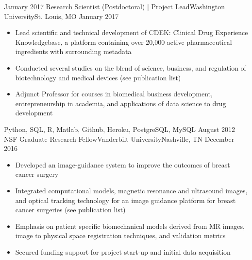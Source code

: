 %
%
%
\begin{experiences}
  \experience
    {January 2017}   {Research Scientist (Postdoctoral) | Project Lead}{Washington University}{St. Louis, MO}
    {January 2017} {
                      \begin{itemize}
                        \item Lead scientific and technical development of CDEK: Clinical Drug Experience Knowledgebase, a platform containing over 20,000 active pharmaceutical ingredients with surrounding metadata                
                        \item Conducted several studies on the blend of science, business, and regulation of biotechnology and medical devices (\aiOrcid see publication list)
                        \item Adjunct Professor for courses in biomedical business development, entrepreneurship in academia, and applications of data science to drug development                                                                
                      \end{itemize}
                    }
                    {Python, SQL, R, Matlab, Github, Heroku, PostgreSQL, MySQL}
  \emptySeparator
  \experience
    {August 2012} {NSF Graduate Research Fellow}{Vanderbilt University}{Nashville, TN}
    {December 2016}    {
                      \begin{itemize}
                        \item Developed an image-guidance system to improve the outcomes of breast cancer surgery                          
                        \item Integrated computational models, magnetic resonance and ultrasound images, and optical tracking technology for an image guidance platform for breast cancer surgeries (\aiOrcid see publication list)           
                        \item Emphasis on patient specific biomechanical models derived from MR images, image to physical space registration techniques, and validation metrics 
                        \item Secured funding support for project start-up and initial data acquisition               
                                                                      

\end{itemize}}
\end{experiences}
